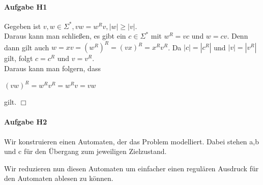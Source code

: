 \documentclass[11pt]{article}
\begin{document}

\paragraph{Aufgabe H1}
Gegeben ist $v,w\in\Sigma^{*}, vw=w^{R}v, \left\lvert w \right\lvert \geq  \left\lvert v \right\lvert$. 
\\Daraus kann man schließen, es gibt ein $c\in\Sigma^{*}$ mit $w^{R}=vc$ und $w=cv$. Denn dann gilt auch $w=xv=(w^{R})^{R}=(vx)^{R}=x^{R}v^{R}$. Da $\left\lvert c \right\lvert = \left\lvert c^{R} \right\lvert$ und $\left\lvert v \right\lvert = \left\lvert v^{R} \right\lvert$ gilt, folgt $c=c^{R}$ und $v=v^{R}$.
\\Daraus kann man folgern, dass
\begin{center}
$(vw)^{R}=w^{R}v^{R}=w^{R}v=vw$
\end{center}
gilt.
\hfill $\Box$

\paragraph{Aufgabe H2}
Wir konstruieren einen Automaten, der das Problem modelliert. Dabei stehen a,b und c für den Übergang zum jeweiligen Zielzustand.
\begin{center}
\end{center}
Wir reduzieren nun diesen Automaten um einfacher einen regulären Ausdruck für den Automaten ablesen zu können.
\end{document}
